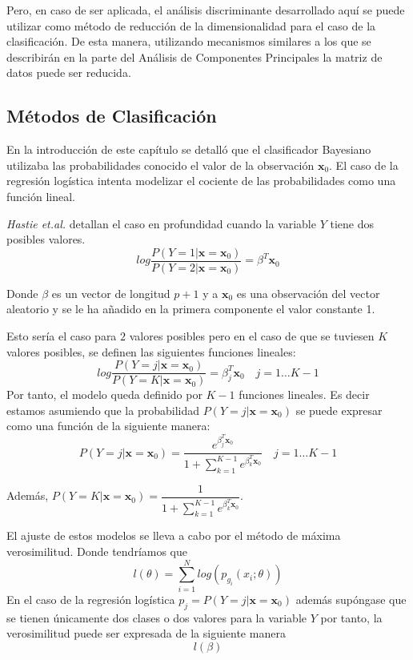 \noindent Pero, en caso de ser aplicada, el análisis discriminante desarrollado aquí se puede utilizar como método de reducción de la dimensionalidad para el caso de la clasificación. De esta manera, utilizando mecanismos similares a los que se describirán en la parte del Análisis de Componentes Principales la matriz de datos puede ser reducida. 

\subsection{Métodos de Clasificación}

\noindent En la introducción de este capítulo se detalló que el clasificador Bayesiano utilizaba las probabilidades conocido el valor de la observación $\textbf{x}_0$. El caso de la regresión logística intenta modelizar el cociente de las probabilidades como una función lineal. 

\noindent \textit{Hastie et.al.}\cite{Hastie 2001} detallan el caso en profundidad cuando la variable $Y$ tiene dos posibles valores.
\begin{equation}
log \dfrac{P(Y=1|\textbf{x}=\textbf{x}_0)}{P(Y=2|\textbf{x}=\textbf{x}_0)}=\beta^T \textbf{x}_0
\end{equation}

\noindent Donde $\beta$ es un vector de longitud $p+1$ y a $\textbf{x}_0$ es una observación del vector aleatorio y se le ha añadido en la primera componente el valor constante 1.

\noindent Esto sería el caso para $2$ valores posibles pero en el caso de que se tuviesen $K$ valores posibles, se definen las siguientes funciones lineales:
\begin{equation}
log \dfrac{P(Y=j|\textbf{x}=\textbf{x}_0)}{P(Y=K|\textbf{x}=\textbf{x}_0)}=\beta_j^T \textbf{x}_0 \quad j=1\ldots K-1
\end{equation}
Por tanto, el modelo queda definido por $K-1$ funciones lineales. Es decir estamos asumiendo que la probabilidad $P(Y=j|\textbf{x}=\textbf{x}_0)$ se puede expresar como una función de la siguiente manera:
\begin{equation}
P(Y=j|\textbf{x}=\textbf{x}_0)=\dfrac{e^{\beta_j^T\textbf{x}_0}}{1+\sum_{k=1}^{K-1}e^{\beta_k^T\textbf{x}_0}} \quad j=1\ldots K-1
\end{equation}

\noindent Además, $P(Y=K|\textbf{x}=\textbf{x}_0)=\dfrac{1}{1+\sum_{k=1}^{K-1}e^{\beta_k^T\textbf{x}_0}}$. 

\noindent El ajuste de estos modelos se lleva a cabo por el método de máxima verosimilitud. Donde tendríamos que \begin{equation}
l(\theta)=\sum_{i=1}^N log(p_{g_i}(x_i;\theta))
\end{equation}
\noindent En el caso de la regresión logística $p_{j}=P(Y=j|\textbf{x}=\textbf{x}_0)$ además supóngase que se tienen únicamente dos clases o dos valores para la variable $Y$ por tanto, la verosimilitud puede ser expresada de la siguiente manera
\begin{equation}
l(\beta)
\end{equation}
